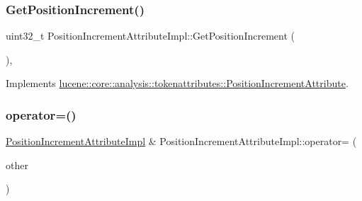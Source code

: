 \subsubsection{\texorpdfstring{Get\+Position\+Increment()}{GetPositionIncrement()}}
{\footnotesize\ttfamily uint32\+\_\+t Position\+Increment\+Attribute\+Impl\+::\+Get\+Position\+Increment (\begin{DoxyParamCaption}{ }\end{DoxyParamCaption})\hspace{0.3cm}{\ttfamily [override]}, {\ttfamily [virtual]}}



Implements \mbox{\hyperlink{classlucene_1_1core_1_1analysis_1_1tokenattributes_1_1PositionIncrementAttribute_af0c59c3fbf138881647e46f05468eb13}{lucene\+::core\+::analysis\+::tokenattributes\+::\+Position\+Increment\+Attribute}}.

\mbox{\label{classlucene_1_1core_1_1analysis_1_1tokenattributes_1_1PositionIncrementAttributeImpl_a8fccb463e29cc9cb90e7689cc7161488}} 
\subsubsection{\texorpdfstring{operator=()}{operator=()}\hspace{0.1cm}{\footnotesize\ttfamily [1/2]}}
{\footnotesize\ttfamily \mbox{\hyperlink{classlucene_1_1core_1_1analysis_1_1tokenattributes_1_1PositionIncrementAttributeImpl}{Position\+Increment\+Attribute\+Impl}} \& Position\+Increment\+Attribute\+Impl\+::operator= (\begin{DoxyParamCaption}\item[{\mbox{\hyperlink{ZlibCrc32_8h_a2c212835823e3c54a8ab6d95c652660e}{const}} \mbox{\hyperlink{classlucene_1_1core_1_1util_1_1AttributeImpl}{lucene\+::core\+::util\+::\+Attribute\+Impl}} \&}]{other }\end{DoxyParamCaption})\hspace{0.3cm}{\ttfamily [virtual]}}



